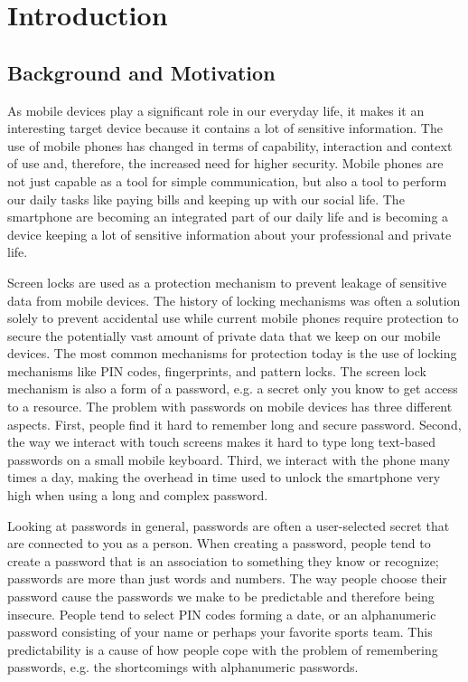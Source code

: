 \chapter{Introduction}\label{chap:introduction}
	
	\clearpage
	\section{Background and Motivation} \label{sec:backgroundandmotivation}

		As mobile devices play a significant role in our everyday life, it makes it an interesting target device because it contains a lot of sensitive information. The use of mobile phones has changed in terms of capability, interaction and context of use and, therefore, the increased need for higher security. Mobile phones are not just capable as a tool for simple communication, but also a tool to perform our daily tasks like paying bills and keeping up with our social life. The smartphone are becoming an integrated part of our daily life and is becoming a device keeping a lot of sensitive information about your professional and private life.

		Screen locks are used as a protection mechanism to prevent leakage of sensitive data from mobile devices. The history of locking mechanisms was often a solution solely to prevent accidental use while current mobile phones require protection to secure the potentially vast amount of private data that we keep on our mobile devices. The most common mechanisms for protection today is the use of locking mechanisms like PIN codes, fingerprints, and pattern locks. The screen lock mechanism is also a form of a password, e.g. a secret only you know to get access to a resource. The problem with passwords on mobile devices has three different aspects. First, people find it hard to remember long and secure password. Second, the way we interact with touch screens makes it hard to type long text-based passwords on a small mobile keyboard. Third, we interact with the phone many times a day, making the overhead in time used to unlock the smartphone very high when using a long and complex password.

		Looking at passwords in general, passwords are often a user-selected secret that are connected to you as a person. When creating a password, people tend to create a password that is an association to something they know or recognize; passwords are more than just words and numbers. The way people choose their password cause the passwords we make to be predictable and therefore being insecure. People tend to select PIN codes forming a date, or an alphanumeric password consisting of your name or perhaps your favorite sports team. This predictability is a cause of how people cope with the problem of remembering passwords, e.g. the shortcomings with alphanumeric passwords. 

